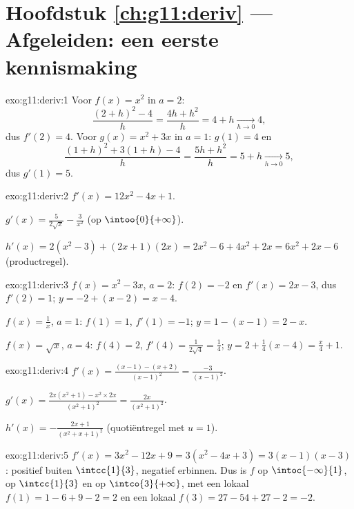 \section*{Hoofdstuk \ref{ch:g11:deriv} --- Afgeleiden: een eerste kennismaking}

\begin{solution}{exo:g11:deriv:1}
Voor $f(x) = x^2$ in $a = 2$:
\[
\frac{(2+h)^2 - 4}{h} = \frac{4h + h^2}{h} = 4 + h
\xrightarrow[h\to0]{} 4,
\]
dus $f'(2) = 4$. Voor $g(x) = x^2 + 3x$ in $a = 1$: $g(1) = 4$ en
\[
\frac{(1+h)^2 + 3(1+h) - 4}{h} = \frac{5h + h^2}{h} = 5 + h
\xrightarrow[h\to0]{} 5,
\]
dus $g'(1) = 5$.
\end{solution}

\begin{solution}{exo:g11:deriv:2}
$f'(x) = 12x^2 - 4x + 1$.

$g'(x) = \frac{5}{2\sqrt x} - \frac{3}{x^2}$ (op $\intoo{0}{+\infty}$).

$h'(x) = 2(x^2 - 3) + (2x+1)(2x) = 2x^2 - 6 + 4x^2 + 2x = 6x^2 + 2x - 6$
(productregel).
\end{solution}

\begin{solution}{exo:g11:deriv:3}
$f(x) = x^2 - 3x$, $a = 2$: $f(2) = -2$ en $f'(x) = 2x - 3$, dus
$f'(2) = 1$;  $y = -2 + (x - 2) = x - 4$.

$f(x) = \frac1x$, $a = 1$: $f(1) = 1$, $f'(1) = -1$; 
$y = 1 - (x - 1) = 2 - x$.

$f(x) = \sqrt x$, $a = 4$: $f(4) = 2$, $f'(4) = \frac{1}{2\sqrt4} =
\frac14$;  $y = 2 + \frac14(x - 4) = \frac{x}{4} + 1$.
\end{solution}

\begin{solution}{exo:g11:deriv:4}
$f'(x) = \frac{(x-1) - (x+2)}{(x-1)^2} = \frac{-3}{(x-1)^2}$.

$g'(x) = \frac{2x(x^2+1) - x^2 \times 2x}{(x^2+1)^2}
= \frac{2x}{(x^2+1)^2}$.

$h'(x) = -\frac{2x+1}{(x^2+x+1)^2}$ (quotiëntregel met $u = 1$).
\end{solution}

\begin{solution}{exo:g11:deriv:5}
$f'(x) = 3x^2 - 12x + 9 = 3(x^2 - 4x + 3) = 3(x-1)(x-3)$: positief buiten
$\intcc{1}{3}$, negatief erbinnen. Dus is $f$  op
$\intoc{-\infty}{1}$,  op $\intcc{1}{3}$ en  op
$\intco{3}{+\infty}$, met een lokaal  $f(1) = 1 - 6 + 9 - 2 = 2$ en
een lokaal  $f(3) = 27 - 54 + 27 - 2 = -2$.
\end{solution}

